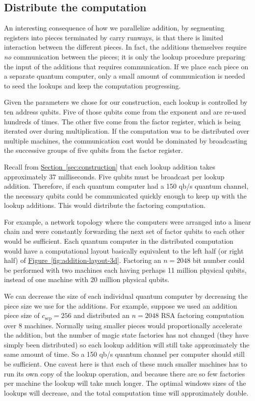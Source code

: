 \documentclass[superscriptaddress,notitlepage,longbibliography]{revtex4-1}
\theoremstyle{definition}
\theoremstyle{definition}
\renewcommand{\sec}[1]{\hyperref[sec:#1]{Section~\ref*{sec:#1}}}
\newcommand{\fig}[1]{\hyperref[fig:#1]{Figure~\ref*{fig:#1}}}
\newcommand{\gsep}{{c_{\text{sep}}}}
\begin{document}
\subsection{Distribute the computation}

An interesting consequence of how we parallelize addition, by segmenting registers into pieces terminated by carry runways, is that there is limited interaction between the different pieces.
In fact, the additions themselves require {\em no} communication between the pieces; it is only the lookup procedure preparing the input of the additions that requires communication.
If we place each piece on a separate quantum computer, only a small amount of communication is needed to seed the lookups and keep the computation progressing.

Given the parameters we chose for our construction, each lookup is controlled by ten address qubits.
Five of those qubits come from the exponent and are re-used hundreds of times.
The other five come from the factor register, which is being iterated over during multiplication.
If the computation was to be distributed over multiple machines, the communication cost would be dominated by broadcasting the successive groups of five qubits from the factor register.

Recall from \sec{construction} that each lookup addition takes approximately 37 milliseconds.
Five qubits must be broadcast per lookup addition.
Therefore, if each quantum computer had a 150 qb/s quantum channel, the necessary qubits could be communicated quickly enough to keep up with the lookup additions.
This would distribute the factoring computation.

For example, a network topology where the computers were arranged into a linear chain and were constantly forwarding the next set of factor qubits to each other would be sufficient.
Each quantum computer in the distributed computation would have a computational layout basically equivalent to the left  half (or right half) of \fig{addition-layout-3d}.
Factoring an $n=2048$ bit number could be performed with two machines each having perhaps 11 million physical qubits, instead of one machine with 20 million physical qubits.

We can decrease the size of each individual quantum computer by decreasing the piece size we use for the additions.
For example, suppose we used an addition piece size of $\gsep=256$ and distributed an $n=2048$ RSA factoring computation over 8 machines.
Normally using smaller pieces would proportionally accelerate the addition, but the number of magic state factories has not changed (they have simply been distributed) so each lookup addition will still take approximately the same amount of time.
So a 150 qb/s quantum channel per computer should still be sufficient.
One caveat here is that each of these much smaller machines has to run its own copy of the lookup operation, and because there are so few factories per machine the lookup will take much longer.
The optimal windows sizes of the lookups will decrease, and the total computation time will approximately double.
\end{document}
